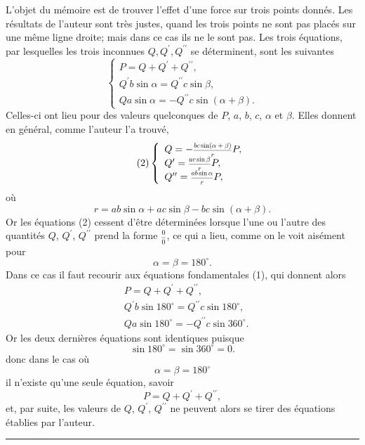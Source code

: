 \documentclass[oneside, 12 pt, leqno]{memoir}
\let\oldfrac\frac
\def\frac#1#2{\mathchoice{\text{\scalebox{.83}{${\oldfrac{#1}{#2}}$}}}{\text{\scalebox{.83}{${\displaystyle\oldfrac{#1}{#2}}$}}}{\genfrac{}{}{}{2}{#1}{#2}}{\genfrac{}{}{}{3}{#1}{#2}}}
\begin{document}
L'objet du mémoire est de trouver l'effet d'une force sur trois points donnés. Les résultats de l'auteur sont très justes, quand les trois points ne sont pas placés sur une même ligne droite; mais dans ce cas ils ne le sont pas. Les trois équations, par lesquelles les trois inconnues \(Q, Q^{\prime}, Q^{\prime \prime}\) se déterminent, sont les suivantes
\[\tag{1}\left\{\begin{array}{l}
P=Q+Q^{\prime}+Q^{\prime \prime}, \\
Q^{\prime} b \sin \alpha=Q^{\prime \prime} c \sin \beta, \\
Q a \sin \alpha=-Q^{\prime \prime} c \sin (\alpha+\beta).
\end{array}\right.\]
Celles-ci ont lieu pour des valeurs quelconques de \(P\), \(a\), \(b\), \(c\), \(\alpha\) et \(\beta\). Elles donnent en général, comme l'auteur l'a trouvé,
\[\tag{2}
\left\{\begin{array}{l}
Q=-\frac{b c \sin (\alpha+\beta)}{r} P, \\
Q^{\prime}=\frac{a c \sin \beta}{r} P, \\
Q^{\prime \prime}=\frac{a b \sin \alpha}{r} P,
\end{array}\right.\]
où
\[r=a b \sin \alpha+a c \sin \beta-b c \sin (\alpha+\beta).\]
Or les équations (2) cessent d'être déterminées lorsque l'une ou l'autre des 
quantités \(Q\), \(Q^{\prime}\), \(Q^{\prime \prime}\) prend la forme \(\frac{0}{0}\), ce qui a lieu, comme on le voit aisément pour
\[\alpha=\beta=180^{\circ}.\]
Dans ce cas il faut recourir aux équations fondamentales (1), qui donnent alors
\[\begin{aligned}
& P=Q+Q^{\prime}+Q^{\prime \prime}, \\
& Q^{\prime} b \sin 180^{\circ}=Q^{\prime \prime} c \sin 180^{\circ}, \\
& Q a \sin 180^{\circ}=-Q^{\prime \prime} c \sin 360^{\circ}.
\end{aligned}\]
Or les deux dernières équations sont identiques puisque
\[\sin 180^{\circ}=\sin 360^{\circ}=0.\]
donc dans le cas où
\[\alpha=\beta=180^{\circ}\]
il n'existe qu'une seule équation, savoir
\[P=Q+Q^{\prime}+Q^{\prime \prime},\]
et, par suite, les valeurs de \(Q\), \(Q^{\prime}\), \(Q^{\prime \prime}\) ne peuvent alors se tirer des équations établies par l'auteur.
\begin{center}\rule{2in}{0.1pt}\end{center}
\vfill
\end{document}
